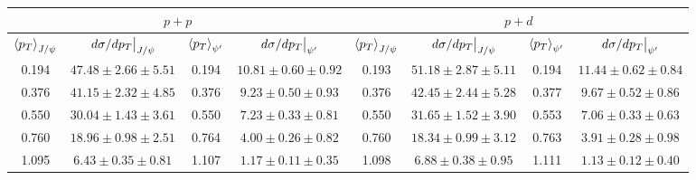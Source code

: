 \begin{tabular}{cccc|cccc}
\hline
\multicolumn{4}{c|}{$p+p$}                                                                                                                                                                                     & \multicolumn{4}{c}{$p+d$}                                                                                                                                                                                     \\ \hline
\multicolumn{1}{c}{$\expval{p_T}_{J/\psi}$} & \multicolumn{1}{c}{$\eval{d\sigma/dp_T}_{J/\psi}$} & \multicolumn{1}{c}{$\expval{p_T}_{\psi^\prime}$} & \multicolumn{1}{c|}{$\eval{d\sigma/dp_T}_{\psi^\prime}$} & \multicolumn{1}{c}{$\expval{p_T}_{J/\psi}$} & \multicolumn{1}{c}{$\eval{d\sigma/dp_T}_{J/\psi}$} & \multicolumn{1}{c}{$\expval{p_T}_{\psi^\prime}$} & \multicolumn{1}{c}{$\eval{d\sigma/dp_T}_{\psi^\prime}$} \\ \hline
0.194                                       & $47.48\pm2.66\pm5.51$                              & 0.194                                            & $10.81\pm0.60\pm0.92$                                    & 0.193                                       & $51.18\pm2.87\pm5.11$                              & 0.194                                            & $11.44\pm0.62\pm0.84$                                   \\
0.376                                       & $41.15\pm2.32\pm4.85$                              & 0.376                                            & $9.23\pm0.50\pm0.93$                                     & 0.376                                       & $42.45\pm2.44\pm5.28$                              & 0.377                                            & $9.67\pm0.52\pm0.86$                                    \\
0.550                                       & $30.04\pm1.43\pm3.61$                              & 0.550                                            & $7.23\pm0.33\pm0.81$                                     & 0.550                                       & $31.65\pm1.52\pm3.90$                              & 0.553                                            & $7.06\pm0.33\pm0.63$                                    \\
0.760                                       & $18.96\pm0.98\pm2.51$                              & 0.764                                            & $4.00\pm0.26\pm0.82$                                     & 0.760                                       & $18.34\pm0.99\pm3.12$                              & 0.763                                            & $3.91\pm0.28\pm0.98$                                    \\
1.095                                       & $6.43\pm0.35\pm0.81$                               & 1.107                                            & $1.17\pm0.11\pm0.35$                                     & 1.098                                       & $6.88\pm0.38\pm0.95$                               & 1.111                                            & $1.13\pm0.12\pm0.40$                                    \\ \hline
\end{tabular}
